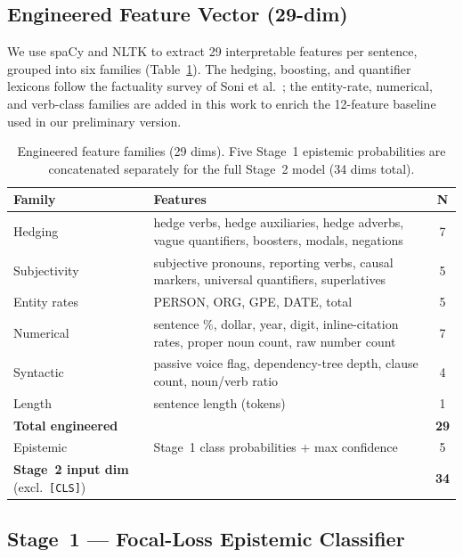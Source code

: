 \documentclass[conference]{IEEEtran}
\begin{document}
\subsection{Engineered Feature Vector (29-dim)}

We use spaCy and NLTK to extract 29 interpretable features per sentence,
grouped into six families (Table~\ref{tab:features}). The hedging,
boosting, and quantifier lexicons follow the factuality survey
of Soni et al.~\cite{soni2021survey}; the entity-rate, numerical, and
verb-class families are added in this work to enrich the 12-feature
baseline used in our preliminary version.

\begin{table}[t]
\centering
\caption{Engineered feature families (29 dims). Five Stage~1 epistemic
probabilities are concatenated separately for the full Stage~2 model
(34 dims total).}
\label{tab:features}
\small
\setlength{\tabcolsep}{5pt}
\begin{tabular}{p{2.0cm}p{4.6cm}c}
\toprule
\textbf{Family} & \textbf{Features} & \textbf{N} \\
\midrule
Hedging       & hedge verbs, hedge auxiliaries, hedge adverbs, vague
                quantifiers, boosters, modals, negations & 7 \\
Subjectivity  & subjective pronouns, reporting verbs, causal markers,
                universal quantifiers, superlatives & 5 \\
Entity rates  & PERSON, ORG, GPE, DATE, total & 5 \\
Numerical     & sentence \%, dollar, year, digit, inline-citation rates,
                proper noun count, raw number count & 7 \\
Syntactic     & passive voice flag, dependency-tree depth,
                clause count, noun/verb ratio & 4 \\
Length        & sentence length (tokens) & 1 \\
\midrule
\textbf{Total engineered} & & \textbf{29} \\
\midrule
Epistemic     & Stage~1 class probabilities + max confidence & 5 \\
\midrule
\textbf{Stage~2 input dim} (excl.\ \texttt{[CLS]}) & & \textbf{34} \\
\bottomrule
\end{tabular}
\end{table}

\subsection{Stage~1 — Focal-Loss Epistemic Classifier}
\label{sec:stage1}
\end{document}
